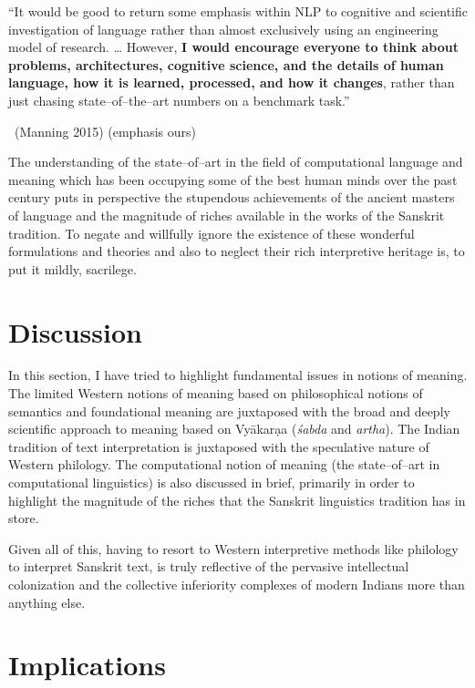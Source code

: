 \begin{myquote}
“It would be good to return some emphasis within NLP to cognitive and scientific investigation of language rather than almost exclusively using an engineering model of research. … However, \textbf{I would encourage everyone to think about problems, architectures, cognitive science, and the details of human language, how it is learned, processed, and how it changes}, rather than just chasing state–of–the–art numbers on a benchmark task.”

~\hfill (Manning 2015) (emphasis ours)
\end{myquote}

The understanding of the state–of–art in the field of computational language and meaning which has been occupying some of the best human minds over the past century puts in perspective the stupendous achievements of the ancient masters of language and the magnitude of riches available in the works of the Sanskrit tradition. To negate and willfully ignore the existence of these wonderful formulations and theories and also to neglect their rich interpretive heritage is, to put it mildly, sacrilege.


\section*{Discussion}

\vskip -7pt

In this section, I have tried to highlight fundamental issues in notions of meaning. The limited Western notions of meaning based on philosophical notions of semantics and foundational meaning are juxtaposed with the broad and deeply scientific approach to meaning based on Vyākarạa (\textit{śabda} and \textit{artha}). The Indian tradition of text interpretation is juxtaposed with the speculative nature of Western philology. The computational notion of meaning (the state–of–art in computational linguistics) is also discussed in brief, primarily in order to highlight the magnitude of the riches that the Sanskrit linguistics tradition has in store.

Given all of this, having to resort to Western interpretive methods like philology to interpret Sanskrit text, is truly reflective of the pervasive intellectual colonization and the collective inferiority complexes of modern Indians more than anything else.


\section*{Implications}

